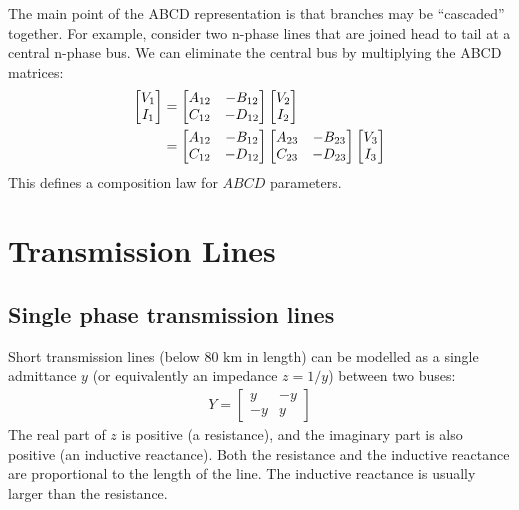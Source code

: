 \documentclass[10pt]{article}
\begin{document}
The main point of the ABCD representation is that branches may be ``cascaded'' together. For example, consider two n-phase lines that are joined head to tail at a central n-phase bus. We can eliminate the central bus by multiplying the ABCD matrices:
\begin{align}
	\begin{bmatrix}
		V_1 \\ I_1
	\end{bmatrix} &=
	\begin{bmatrix}
		A_{12} & -B_{12} \\ C_{12} & -D_{12}
	\end{bmatrix}
	\begin{bmatrix}
		V_2 \\ I_2
	\end{bmatrix} \notag \\
	&=
	\begin{bmatrix}
		A_{12} & -B_{12} \\ C_{12} & -D_{12}
	\end{bmatrix}
	\begin{bmatrix}
		A_{23} & -B_{23} \\ C_{23} & -D_{23}
	\end{bmatrix}
	\begin{bmatrix}
		V_3 \\ I_3
	\end{bmatrix}
\end{align}
This defines a composition law for $ABCD$ parameters.
\section{Transmission Lines}
\subsection{Single phase transmission lines}
Short transmission lines (below 80 km in length) can be modelled as a single admittance $y$ (or equivalently an impedance $z = 1/y$) between two buses:
\begin{align}
	Y = \begin{bmatrix}
		y & -y \\ -y & y
	\end{bmatrix}
\end{align}
The real part of $z$ is positive (a resistance), and the imaginary part is also positive (an inductive reactance). Both the resistance and the inductive reactance are proportional to the length of the line. The inductive reactance is usually larger than the resistance.
\end{document}
